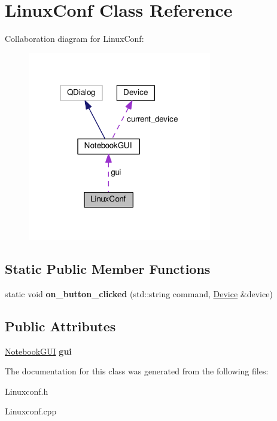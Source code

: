 \hypertarget{classLinuxConf}{}\section{Linux\+Conf Class Reference}
\label{classLinuxConf}


Collaboration diagram for Linux\+Conf\+:\nopagebreak
\begin{figure}[H]
\begin{center}
\leavevmode
\includegraphics[width=227pt]{classLinuxConf__coll__graph}
\end{center}
\end{figure}
\subsection*{Static Public Member Functions}
\begin{DoxyCompactItemize}
\item 
\mbox{\label{classLinuxConf_a6c618d4ab944d98f18830e33c1102609}} 
static void {\bfseries on\+\_\+button\+\_\+clicked} (std\+::string command, \hyperlink{classDevice}{Device} \&device)
\end{DoxyCompactItemize}
\subsection*{Public Attributes}
\begin{DoxyCompactItemize}
\item 
\mbox{\label{classLinuxConf_a59770ab7bb16baf7f3ceb6cb757216e6}} 
\hyperlink{classNotebookGUI}{Notebook\+G\+UI} {\bfseries gui}
\end{DoxyCompactItemize}


The documentation for this class was generated from the following files\+:\begin{DoxyCompactItemize}
\item 
Linuxconf.\+h\item 
Linuxconf.\+cpp\end{DoxyCompactItemize}
